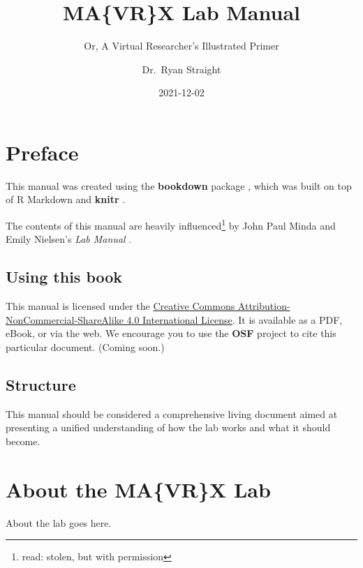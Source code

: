 \documentclass[
]{book}
\title{MA\{VR\}X Lab Manual}
\subtitle{Or, A Virtual Researcher's Illustrated Primer}
\author{Dr.~Ryan Straight}
\date{2021-12-02}
\begin{document}
\maketitle

{
\hypersetup{linkcolor=}
\setcounter{tocdepth}{1}
\tableofcontents
}
\listoftables
\listoffigures
\hypertarget{preface}{%
\chapter*{Preface}\label{preface}}

This manual was created using the \textbf{bookdown} package \citep{R-bookdown}, which was built on top of R Markdown and \textbf{knitr} \citep{xie2015}.

The contents of this manual are heavily influenced\footnote{read: stolen, but with permission} by John Paul Minda and Emily Nielsen's \emph{Lab Manual} \citeyearpar{Minda_Nielsen_2018}.

\hypertarget{using-this-book}{%
\section*{Using this book}\label{using-this-book}}

This manual is licensed under the \href{http://creativecommons.org/licenses/by-nc-sa/4.0/}{Creative Commons Attribution-NonCommercial-ShareAlike 4.0 International License}. It is available as a PDF, eBook, or via the web. We encourage you to use the \textbf{OSF} project to cite this particular document. (Coming soon.)

\hypertarget{structure}{%
\section*{Structure}\label{structure}}

This manual should be considered a comprehensive living document aimed at presenting a unified understanding of how the lab works and what it should become.

\hypertarget{about-the-mavrx-lab}{%
\chapter*{About the MA\{VR\}X Lab}\label{about-the-mavrx-lab}}

About the lab goes here.
\end{document}
